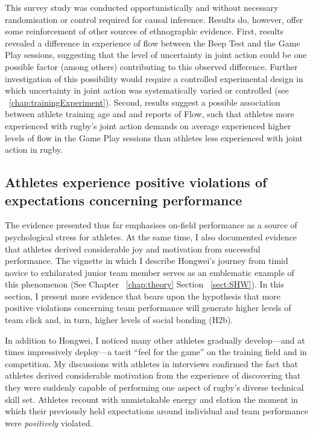 \begin{CJK}{UTF8}{gbsn}

This survey study was conducted opportunistically and without necessary randomisation or control required for causal inference.  Results do, however, offer some reinforcement of other sources of ethnographic evidence.  First, results revealed a difference in experience of flow between the Beep Test and the Game Play sessions, suggesting that the level of uncertainty in joint action could be one possible factor (among others) contributing to this observed difference.  Further investigation of this possibility would require a controlled experimental design in which uncertainty in joint action was systematically varied or controlled (see ~\ref{chap:trainingExperiment}).  Second, results suggest a possible association between athlete training age and and reports of Flow, such that athletes more experienced with rugby's joint action demands on average experienced higher levels of flow in the Game Play sessions than athletes less experienced with joint action in rugby.




\subsection{Athletes experience positive violations of expectations concerning performance\label{sect:expectationViolation}}
The evidence presented thus far emphasises on-field performance as a source of psychological stress for athletes.  At the same time, I also documented evidence that athletes derived considerable joy and motivation from successful performance.  The vignette in which I describe Hongwei's journey from timid novice to exhilarated junior team member serves as an emblematic example of this phenomenon (See Chapter ~\ref{chap:theory} Section ~\ref{sect:SHW}).  In this section, I present more evidence that bears upon the hypothesis that more positive violations concerning team performance will generate higher levels of team click and, in turn, higher levels of social bonding (H2b).

In addition to Hongwei, I noticed many other athletes gradually develop---and at times impressively deploy---a tacit ``feel for the game'' on the training field and in competition.  My discussions with athletes in interviews confirmed the fact that athletes derived considerable motivation from the experience of discovering that they were suddenly capable of performing one aspect of rugby's diverse technical skill set.  Athletes recount with unmistakable energy and elation the moment in which their previously held expectations around individual and team performance were \textit{positively} violated.


\end{CJK}
